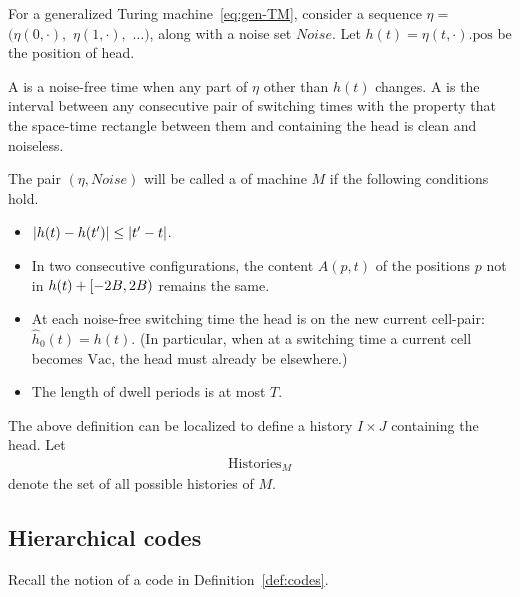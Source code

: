 \documentclass[11pt]{memoir}
\theoremstyle{definition} %
\renewcommand{\le}{\leq}
\def\B{B}
\newcommand{\h}{h} %
\newcommand{\hc}{\hat h}
\newcommand{\Noise}{\mathit{Noise}}
\newcommand{\pos}{\mathrm{pos}}
\newcommand{\Tu}{T}
\newcommand{\Histories}{\mathrm{Histories}}
\newcommand{\Vacant}{\mathrm{Vac}}
\begin{document}
\begin{definition}[History]
For a generalized Turing machine~\eqref{eq:gen-TM}, consider
a sequence \( \eta = \) \( ( \eta(0,\cdot),\) \( \eta(1,\cdot),\) \( \dots) \),
along with a noise set \( \Noise \).
Let \( \h(t)= \eta(t,\cdot).\pos \) be the position of head.

A  is a noise-free time when any part of \( \eta \) other than \( \h(t) \)
changes.
A  is the interval between any consecutive pair of
switching times with the property that the
space-time rectangle between them and containing the head is clean and noiseless.

The pair \(  (\eta,\Noise) \) will be called a 
of machine \( M \) if the following conditions hold.
\begin{itemize}
\item \( \abs{\h(t) - \h(t')} \le \abs{t' - t} \).
  
\item In two consecutive configurations, the content \( A(p,t) \) of the positions \( p \)
  not in \( \h(t) + \lint{-2\B}{2\B} \) remains the same.
\item At each noise-free switching time the head is on the new current cell-pair:
  \( \hc_{0}(t)=\h(t) \).
(In particular, when at a switching time a current cell becomes
\( \Vacant \), the head must already be elsewhere.)

\item The length of dwell periods is at most \( \Tu \).

\end{itemize}
The above definition can be localized to define a history \( I\times J \) containing the head.
Let
\begin{align*}
  \Histories_{M}
\end{align*}
denote the set of all possible histories of \( M \).
\end{definition}



\subsection{Hierarchical codes}\label{sec:hier-codes}

Recall the notion of a code in Definition~\ref{def:codes}.
\end{document}
